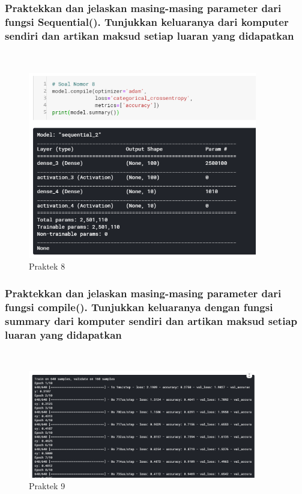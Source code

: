 \subsubsection{Praktekkan dan jelaskan masing-masing parameter dari fungsi Sequential(). Tunjukkan keluaranya dari komputer sendiri dan artikan maksud setiap luaran yang didapatkan}
\hfill\\


	 
	\begin{figure}[H]
		\begin{center}
		 \includegraphics[width=10cm]{figures/1174076/figures6/praktek8.png}
		 \caption{Praktek 8}	
		\end{center}
	\end{figure}
 
\subsubsection{Praktekkan dan jelaskan masing-masing parameter dari fungsi compile(). Tunjukkan keluaranya dengan fungsi summary dari komputer sendiri dan artikan maksud setiap luaran yang didapatkan}
\hfill\\


	 
	\begin{figure}[H]
		\begin{center}
		 \includegraphics[width=10cm]{figures/1174076/figures6/praktek9.png}
		 \caption{Praktek 9}	
		\end{center}
	\end{figure}
 
